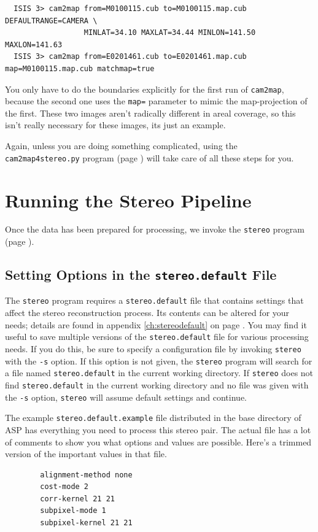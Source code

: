 \begin{Verbatim}
  ISIS 3> cam2map from=M0100115.cub to=M0100115.map.cub DEFAULTRANGE=CAMERA \
                  MINLAT=34.10 MAXLAT=34.44 MINLON=141.50 MAXLON=141.63
  ISIS 3> cam2map from=E0201461.cub to=E0201461.map.cub map=M0100115.map.cub matchmap=true
\end{Verbatim}

You only have to do the boundaries explicitly for the first run of
\texttt{cam2map}, because the second one uses the \texttt{map=}
parameter to mimic the map-projection of the first.  These two
images aren't radically different in areal coverage, so this isn't
really necessary for these images, its just an example.

Again, unless you are doing something complicated, using the
\texttt{cam2map4stereo.py} program (page \pageref{cam2map4stereo})
will take care of all these steps for you.

\section{Running the Stereo Pipeline}
\label{running-stereo}

Once the data has been prepared for processing, we invoke the 
\texttt{stereo} program (page \pageref{stereo}).

\subsection{Setting Options in the \texttt{stereo.default} File}
\label{settingoptionsinstereodefault}

The \texttt{stereo} program requires a \texttt{stereo.default} file that
contains settings that affect the stereo reconstruction process.  Its
contents can be altered for your needs; details are found in appendix
\ref{ch:stereodefault} on page \pageref{ch:stereodefault}.  You may find
it useful to save multiple versions of the \texttt{stereo.default} file
for various processing needs. If you do this, be sure to specify a
configuration file by invoking \texttt{stereo} with the \texttt{-s}
option.  If this option is not given, the \texttt{stereo} program will
search for a file named \texttt{stereo.default} in the current working
directory. If \texttt{stereo} does not find \texttt{stereo.default} in
the current working directory and no file was given with the \texttt{-s}
option, \texttt{stereo} will assume default settings and continue.

The example \texttt{stereo.default.example} file distributed in the
base directory of \ac{ASP} has everything you need to process this
stereo pair. The actual file has a lot of comments to show you what
options and values are possible. Here's a trimmed version of the
important values in that file.
\begin{verbatim}
        alignment-method none
        cost-mode 2
        corr-kernel 21 21
        subpixel-mode 1
        subpixel-kernel 21 21
\end{verbatim}

